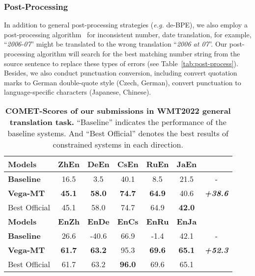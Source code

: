 \documentclass[11pt,a4paper]{article}
\newcommand{\zct}{\color{black}}
\begin{document}
\subsubsection{Post-Processing}
\label{ssec:post}
In addition to general post-processing strategies (\textit{e.g.} de-BPE), we also employ a post-processing algorithm~\cite{wang-etal-2018-niutrans} for inconsistent number, date translation, for example, ``\textit{2006-07}'' might be translated to the wrong translation ``\textit{2006 at 07}''. Our post-processing algorithm will search for the best matching number string from the source sentence to replace these types of errors {\zct (see Table~\ref{tab:post-process})}.
Besides, we also conduct punctuation conversion, including convert quotation marks to German
double-quote style (Czech, German), convert punctuation to language-specific characters (Japanese, Chinese).


\begin{table*}[t]
    \centering 
    \begin{tabular}{lcccccc}
    \toprule
    \textbf{Models}        & \textbf{ZhEn} & \textbf{DeEn} & \textbf{CsEn} & \textbf{RuEn} & \textbf{JaEn} & \textbf{}\\ \hline
    \textbf{Baseline}      & 16.5           & 3.5             & 40.1            & 8.5             & 21.5           &- \\
    \textbf{Vega-MT}    & \textbf{45.1}   & \textbf{58.0}   & \textbf{74.7}   & \textbf{64.9}   & 40.6           &\textbf{\textit{+38.6}}\\ \hdashline
    {Best Official} & 45.1            & 58.0            & 74.7            & 64.9            & \bf 42.0            \\ \midrule
    \textbf{Models}        & \textbf{EnZh} & \textbf{EnDe} & \textbf{EnCs} & \textbf{EnRu} & \textbf{EnJa} &\textbf{}\\\hline
    \textbf{Baseline}      & 26.6            & -40.6           & 66.9            & -1.4            & 42.1            &-\\
    \textbf{Vega-MT}    & \textbf{61.7}   & \textbf{63.2}   & {95.3}   & \textbf{69.6}   & \textbf{65.1}  &\textbf{\textit{+52.3}} \\ \hdashline
    {Best Official} & 61.7            & 63.2            & \bf 96.0            & 69.6            & 65.1            \\ 
    \bottomrule
    \end{tabular}
    \caption{\label{tab:comet} \textbf{COMET-Scores of our submissions in WMT2022 general translation task.} ``Baseline'' indicates the performance of the baseline systems. And ``Best Official'' denotes the best results of {\zct constrained systems} in each direction.}
\end{table*}
\end{document}
